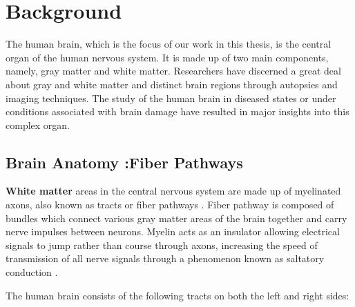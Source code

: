 \documentclass[../structure.tex]{subfiles}
\begin{document}
\chapter{Background}

	The human brain, which is the focus of our work in this thesis, is the central organ of the human nervous system. It is made up of two main components, namely, gray 	     			    matter and white matter. Researchers have discerned a great deal about gray and white matter and distinct brain regions through autopsies and imaging techniques. The study 		of the human brain in diseased states or under conditions associated with brain damage have resulted in major insights into this complex organ.

\section{Brain Anatomy :Fiber Pathways}

	 \textbf{White matter} areas in the central nervous system are made up of myelinated axons, also known as tracts or fiber pathways \cite{Blumenfeld2010}. Fiber pathway is composed of bundles which connect various gray matter areas of the brain together and carry nerve impulses between neurons. Myelin acts as an insulator allowing electrical signals to jump rather than course through axons, increasing the speed of transmission of all nerve signals through a phenomenon known as saltatory conduction \cite{Klein2008}.
	
	The human brain consists of the following tracts on both the left and right sides:
	\begin{comment}
   \begin{itemize}
       \item Anterior Thalamic Radiation (ATR)
       \item Corpus Callosum (CC)
       \item Genu of the Corpus Callosum (genu)
       \item Splenium of the Corpus Callosum (splenium)
       \item Body of Corpus Callosum (truncus)
		\item Cingulum (Cing)
		\item Corticospinal Tract (CST)
		\item Inferior Fronto-occipital Fasciculus (IFO)
		\item Inferior Longitudinal Fasciculus (ILF)
		\item Superior Longitudinal Fasciculus (SLF)
		\item Ventral Tegmental Area (VTA)
	\end{itemize}
	\end{comment}
\end{document}
